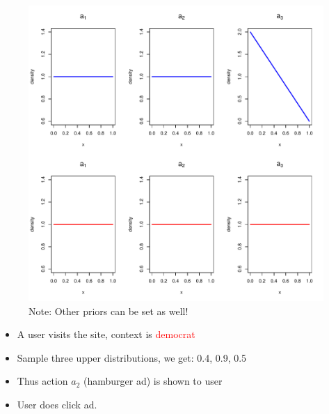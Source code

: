 \documentclass{beamer}
\begin{document}
\begin{frame}
  \begin{figure}
    \includegraphics[scale=.5]{b2.pdf}
    \caption{Note: Other priors can be set as well!}
  \end{figure}
\end{frame}

\begin{frame}
  \begin{itemize}
    \item{A user visits the site, context is \textcolor{red}{democrat}}
    \item{Sample three upper distributions, we get: 0.4, 0.9, 0.5}
    \item{Thus action $a_2$ (hamburger ad) is shown to user}
    \item{User does click ad.}
  \end{itemize}
\end{frame}
\end{document}

